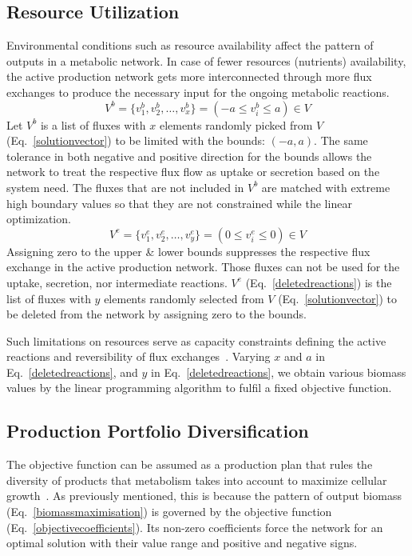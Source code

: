 \subsection*{Resource Utilization}
%
Environmental conditions such as resource availability affect the pattern of outputs in a metabolic network. In case of fewer resources (nutrients) availability, the active production network gets more interconnected through more flux exchanges to produce the necessary input for the ongoing metabolic reactions.~\cite{PRICE2004,MAHADEVAN2003,Reed01092004,BURGARD2001}
\begin{equation} %
	V^{b}=\{v^{b}_{1}, v^{b}_{2},\dots, v^{b}_{x}\}= (-a\le v^{b}_{i}\le a)\in V
	\label{constrainedfluxlist}
\end{equation}
Let $V^{b}$ is a list of fluxes with $x$ elements randomly picked from $V$ (Eq.~\eqref{solutionvector}) to be limited with the bounds: $(-a, a)$. The same tolerance in both negative and positive direction for the bounds allows the network to treat the respective flux flow as uptake or secretion based on the system need. The fluxes that are not included in $V^{b}$ are matched with extreme high boundary values so that they are not constrained while the linear optimization.
\begin{equation} %
	V^{e}=\{v^{e}_{1}, v^{e}_{2},\dots, v^{e}_{y}\}= (0\le v^{e}_{i}\le 0)\in V
	\label{deletedreactions}
\end{equation}
Assigning zero to the upper \& lower bounds suppresses the respective flux exchange in the active production network. Those fluxes can not be used for the uptake, secretion, nor intermediate reactions. $V^{e}$ (Eq.~\eqref{deletedreactions}) is the list of fluxes with $y$ elements randomly selected from $V$ (Eq.~\eqref{solutionvector}) to be deleted from the network by assigning zero to the bounds.

Such limitations on resources serve as capacity constraints defining the active reactions and reversibility of flux exchanges~\cite{Edwards2001}. Varying $x$ and $a$ in Eq.~\eqref{deletedreactions}, and $y$ in Eq.~\eqref{deletedreactions}, we obtain various biomass values by the linear programming algorithm to fulfil a fixed objective function.

\subsection*{Production Portfolio Diversification}
%
The objective function can be assumed as a production plan that rules the diversity of products that metabolism takes into account to maximize cellular growth~\cite{Edwards2001}. As previously mentioned, this is because the pattern of output biomass (Eq.~\eqref{biomassmaximisation}) is governed by the objective function (Eq.~\eqref{objectivecoefficients}). Its non-zero coefficients force the network for an optimal solution with their value range and positive and negative signs.    

